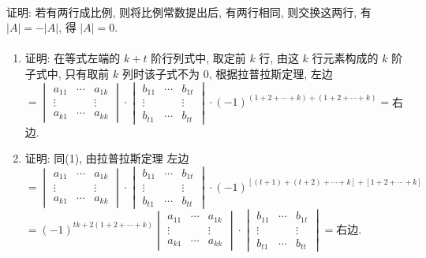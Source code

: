 	\paragraph{} %
		证明: 若有两行成比例, 则将比例常数提出后, 有两行相同,
		则交换这两行, 有 $|A| = -|A|$,
		得 $|A| = 0$.


	\paragraph{} %
		\begin{enumerate}
			\item %
			      证明: 在等式左端的 $k+t$ 阶行列式中, 取定前 $k$ 行, 由这 $k$ 行元素构成的 $k$ 阶子式中, 只有取前 $k$ 列时该子式不为 0, 根据拉普拉斯定理,
			      左边 $= \begin{vmatrix}
					      a_{11} & \cdots & a_{1k} \\
					      \vdots &        & \vdots \\
					      a_{k1} & \cdots & a_{kk}
				      \end{vmatrix} \cdot \begin{vmatrix}
					      b_{11} & \cdots & b_{1t} \\
					      \vdots &        & \vdots \\
					      b_{t1} & \cdots & b_{tt}
				      \end{vmatrix} \cdot (-1)^{(1+2+\cdots+k)+(1+2+\cdots+k)} = $右边.

			\item %
			      证明: 同(1), 由拉普拉斯定理
			      左边 $= \begin{vmatrix}
					      a_{11} & \cdots & a_{1k} \\
					      \vdots &        & \vdots \\
					      a_{k1} & \cdots & a_{kk}
				      \end{vmatrix} \cdot \begin{vmatrix}
					      b_{11} & \cdots & b_{1t} \\
					      \vdots &        & \vdots \\
					      b_{t1} & \cdots & b_{tt}
				      \end{vmatrix} \cdot (-1)^{[(t+1)+(t+2)+\cdots+k]+[1+2+\cdots+k]}$
			      $= (-1)^{tk+2(1+2+\cdots+k)} \begin{vmatrix}
					      a_{11} & \cdots & a_{1k} \\
					      \vdots &        & \vdots \\
					      a_{k1} & \cdots & a_{kk}
				      \end{vmatrix} \cdot \begin{vmatrix}
					      b_{11} & \cdots & b_{1t} \\
					      \vdots &        & \vdots \\
					      b_{t1} & \cdots & b_{tt}
				      \end{vmatrix} = $右边.
		\end{enumerate}


